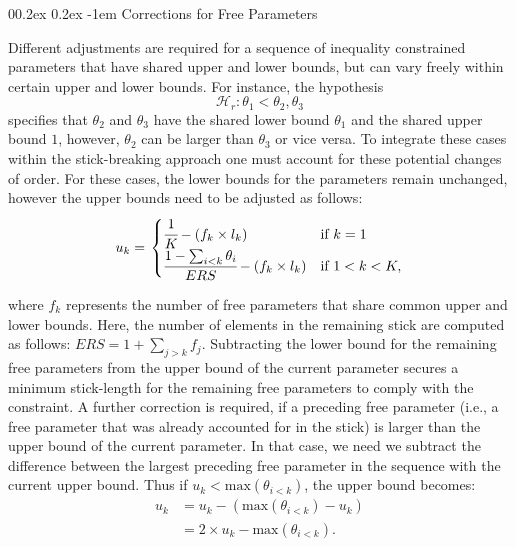 \documentclass[
  english,
  man,floatsintext]{apa6}
\makeatletter
\let\oldparagraph\paragraph
\renewcommand{\paragraph}[1]{\oldparagraph{#1}\mbox{}}
\renewcommand{\paragraph}{\@startsection{paragraph}{4}{\parindent}%
  {0\baselineskip \@plus 0.2ex \@minus 0.2ex}%
  {-1em}%
  {\normalfont\normalsize\bfseries\itshape\typesectitle}}
\makeatother
\begin{document}
\begin{appendix}
\hypertarget{corrections-for-free-parameters}{%
\paragraph{Corrections for Free
Parameters}\label{corrections-for-free-parameters}}

Different adjustments are required for a sequence of inequality
constrained parameters that have shared upper and lower bounds, but can
vary freely within certain upper and lower bounds. For instance, the
hypothesis \[\mathcal{H}_r: \theta_1 < \theta_2, \theta_3\] specifies
that \(\theta_2\) and \(\theta_3\) have the shared lower bound
\(\theta_1\) and the shared upper bound \(1\), however, \(\theta_2\) can
be larger than \(\theta_3\) or vice versa. To integrate these cases
within the stick-breaking approach one must account for these potential
changes of order. For these cases, the lower bounds for the parameters
remain unchanged, however the upper bounds need to be adjusted as
follows: \begin{align}
u_k = \left.
\begin{cases}
\cfrac{1}{K} - (f_k \times l_k) & \text{if } k = 1 \\
\cfrac{1 - \sum_{i < k} \theta_i}{ERS} - (f_k \times l_k) & \text{if } 1 < k < K,
\end{cases}
\right.
\end{align}

where \(f_k\) represents the number of free parameters that share common
upper and lower bounds. Here, the number of elements in the remaining
stick are computed as follows: \(ERS = 1 + \sum_{j > k} f_j\).
Subtracting the lower bound for the remaining free parameters from the
upper bound of the current parameter secures a minimum stick-length for
the remaining free parameters to comply with the constraint. A further
correction is required, if a preceding free parameter (i.e., a free
parameter that was already accounted for in the stick) is larger than
the upper bound of the current parameter. In that case, we need we
subtract the difference between the largest preceding free parameter in
the sequence with the current upper bound. Thus if
\(u_k < \text{max}(\theta_{i < k})\), the upper bound becomes:
\begin{align}
u_k &= u_k - (\text{max}(\theta_{i < k}) - u_k)\\
&= 2 \times u_k - \text{max}(\theta_{i < k}).
\end{align}


\end{appendix}
\end{document}
